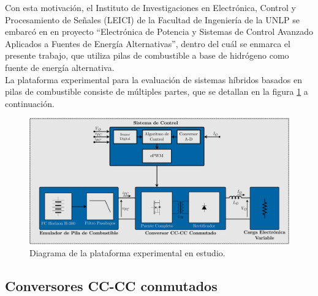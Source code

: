 Con esta motivación, el Instituto de Investigaciones en Electrónica, Control y Procesamiento de Señales (LEICI) de la Facultad de Ingeniería de la UNLP se embarcó en en proyecto ``Electrónica de Potencia y Sistemas de Control Avanzado Aplicados a Fuentes de Energía Alternativas'', dentro del cuál se enmarca el presente trabajo, que utiliza pilas de combustible a base de hidrógeno como fuente de energía alternativa.\\

La plataforma experimental para la evaluación de sistemas híbridos basados en pilas de combustible consiste de múltiples partes, que se detallan en la figura \ref{diag_plataforma} a continuación.

\begin{figure}[H]
    \centering
    \includegraphics[scale=0.4]{Imagenes/Plataforma Experimental.pdf}
    \caption{Diagrama de la plataforma experimental en estudio.}
    \label{diag_plataforma}
\end{figure}



\subsection{Conversores CC-CC conmutados}

